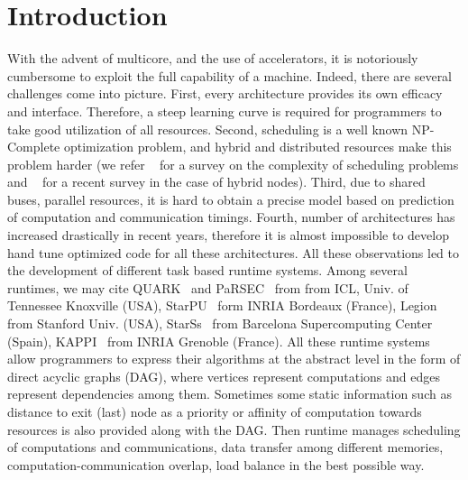 \documentclass[runningheads]{llncs} %
\begin{document}
	
	\section{Introduction} 
	\label{sec:intro}
			
	With the advent of multicore, and the use of accelerators, it is notoriously cumbersome to exploit the full capability of a machine. Indeed, there are several challenges come into picture. First, every architecture provides its own efficacy and interface. Therefore, a steep learning curve is required for programmers to take good utilization of all resources. Second, scheduling is a well known NP-Complete optimization problem, and hybrid and distributed resources make this problem harder (we refer ~\cite{webpagescheduling} for a survey on the complexity of scheduling problems and ~\cite{bleuse2015scheduling} for a recent survey in the case of hybrid nodes). Third, due to shared buses, parallel resources, it is hard to obtain a precise model based on prediction of computation and communication timings. Fourth, number of architectures has increased drastically in recent years, therefore it is almost impossible to develop hand tune optimized code for all these architectures. All these observations led to the development of different task based runtime systems. Among several runtimes, we may cite QUARK~\cite{YarKhan:2011:Quark:Manual} and PaRSEC~\cite{parsec} from from ICL, Univ. of Tennessee Knoxville (USA), StarPU~\cite{starpu} form INRIA Bordeaux (France), Legion~\cite{legion12} from Stanford Univ. (USA), StarSs~\cite{ompss} from Barcelona Supercomputing Center (Spain), KAPPI~\cite{kaapi} from INRIA Grenoble (France). All these runtime systems allow programmers to express their algorithms at the abstract level in the form of direct acyclic graphs (DAG), where vertices represent computations and edges represent dependencies among them. Sometimes some static information such as distance to exit (last) node as a priority or affinity of computation towards resources is also provided along with the DAG. Then runtime manages scheduling of computations and communications, data transfer among different memories, computation-communication overlap, load balance in the best possible way.  
		
		
\end{document}
